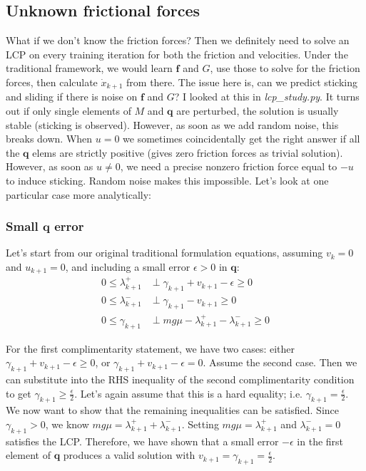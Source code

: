 \documentclass{article}
\renewcommand{\vec}[1]{\boldsymbol{#1}}
\begin{document}
\subsection{Unknown frictional forces}
What if we don't know the friction forces? Then we definitely need to solve an LCP on every training iteration for both the friction and velocities. Under the traditional framework, we would learn $\vec{f}$ and $G$, use those to solve for the friction forces, then calculate $\dot x_{k+1}$ from there. The issue here is, can we predict sticking and sliding if there is noise on $\vec{f}$ and $G$? I looked at this in \textit{lcp\_study.py}. It turns out if only single elements of $M$ and $\vec{q}$ are perturbed, the solution is usually stable (sticking is observed). However, as soon as we add random noise, this breaks down. When $u=0$ we sometimes coincidentally get the right answer if all the $\vec{q}$ elems are strictly positive (gives zero friction forces as trivial solution). However, as soon as $u \neq 0$, we need a precise nonzero friction force equal to $-u$ to induce sticking. Random noise makes this impossible. Let's look at one particular case more analytically:

\subsubsection{Small $\vec{q}$ error}
Let's start from our original traditional formulation equations, assuming $v_k = 0$ and $u_{k+1} = 0$, and including a small error $\epsilon > 0$ in $\vec{q}$:
\begin{align*}
    0 \leq \lambda^+_{k+1} &\perp \gamma_{k+1} + v_{k+1} - \epsilon \geq 0\\
    0 \leq \lambda^-_{k+1} &\perp \gamma_{k+1} - v_{k+1} \geq 0\\
    0 \leq \gamma_{k+1} &\perp m g \mu - \lambda^+_{k+1} - \lambda^-_{k+1} \geq 0
\end{align*}

For the first complimentarity statement, we have two cases: either $\gamma_{k+1} + v_{k+1} - \epsilon \geq 0$, or $\gamma_{k+1} + v_{k+1} - \epsilon = 0$. Assume the second case. Then we can substitute into the RHS inequality of the second complimentarity condition to get $\gamma_{k+1} \geq \frac{\epsilon}{2}$. Let's again assume that this is a hard equality; i.e. $\gamma_{k+1} = \frac{\epsilon}{2}$. We now want to show that the remaining inequalities can be satisfied. Since $\gamma_{k+1} > 0$, we know $m g \mu = \lambda^+_{k+1} + \lambda^-_{k+1}$. Setting $m g \mu = \lambda^+_{k+1}$ and $\lambda^-_{k+1} = 0$ satisfies the LCP. Therefore, we have shown that a small error $-\epsilon$ in the first element of $\vec{q}$ produces a valid solution with $v_{k+1} = \gamma_{k+1} = \frac{\epsilon}{2}$. 
\end{document}
